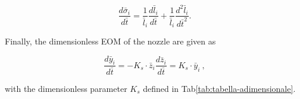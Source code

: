 \begin{equation}
\frac{d\bar{\sigma}_{i}}{d\bar{t}}=\frac{1}{\bar{l}_{i}}\frac{d\bar{l}_{i}}{d\bar{t}}+\frac{1}{\bar{l}_{i}}\frac{d^{2}\bar{l}_{i}}{d\bar{t}^{2}}.
\end{equation}

Finally, the dimensionless EOM of the nozzle are given as

\begin{subequations}

\begin{equation}
\frac{d\bar{y}_{i}}{d\bar{t}}=-K_{s}\cdot\bar{z}_{i}
\end{equation}

\begin{equation}
\frac{d\bar{z}_{i}}{d\bar{t}}=K_{s}\cdot\bar{y}_{i}\:,
\end{equation}

\end{subequations}

with the dimensionless parameter $K_{s}$ defined in Tab\ref{tab:tabella-adimensionale}.

